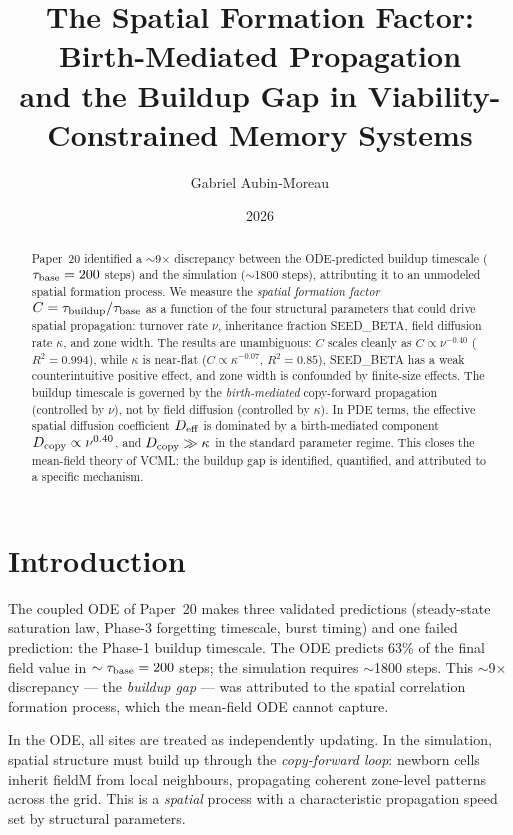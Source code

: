 \documentclass[11pt]{article}
\title{The Spatial Formation Factor: Birth-Mediated Propagation\\
       and the Buildup Gap in Viability-Constrained Memory Systems}
\author{Gabriel Aubin-Moreau}
\date{2026}
\begin{document}
\maketitle

\begin{abstract}
Paper~20 identified a $\sim$9$\times$ discrepancy between the ODE-predicted buildup
timescale ($\tau_{\rm base} = 200$ steps) and the simulation ($\sim$1800 steps),
attributing it to an unmodeled spatial formation process.
We measure the \emph{spatial formation factor} $C = \tau_{\rm buildup}/\tau_{\rm base}$
as a function of the four structural parameters that could drive spatial propagation:
turnover rate $\nu$, inheritance fraction \textrm{SEED\_BETA}, field diffusion rate
$\kappa$, and zone width.
The results are unambiguous: $C$ scales cleanly as $C \propto \nu^{-0.40}$ ($R^2=0.994$),
while $\kappa$ is near-flat ($C \propto \kappa^{-0.07}$, $R^2=0.85$),
\textrm{SEED\_BETA} has a weak counterintuitive positive effect,
and zone width is confounded by finite-size effects.
The buildup timescale is governed by the \emph{birth-mediated} copy-forward propagation
(controlled by $\nu$), not by field diffusion (controlled by $\kappa$).
In PDE terms, the effective spatial diffusion coefficient $D_{\rm eff}$ is dominated
by a birth-mediated component $D_{\rm copy} \propto \nu^{0.40}$, and
$D_{\rm copy} \gg \kappa$ in the standard parameter regime.
This closes the mean-field theory of VCML: the buildup gap is identified,
quantified, and attributed to a specific mechanism.
\end{abstract}

\section{Introduction}

The coupled ODE of Paper~20 makes three validated predictions (steady-state saturation
law, Phase-3 forgetting timescale, burst timing) and one failed prediction: the Phase-1
buildup timescale.
The ODE predicts 63\% of the final field value in $\sim\tau_{\rm base} = 200$ steps;
the simulation requires $\sim$1800 steps.
This $\sim$9$\times$ discrepancy --- the \emph{buildup gap} --- was attributed to the
spatial correlation formation process, which the mean-field ODE cannot capture.

In the ODE, all sites are treated as independently updating.
In the simulation, spatial structure must build up through the \emph{copy-forward loop}:
newborn cells inherit fieldM from local neighbours, propagating coherent zone-level
patterns across the grid.
This is a \emph{spatial} process with a characteristic propagation speed set by
structural parameters.
\end{document}
